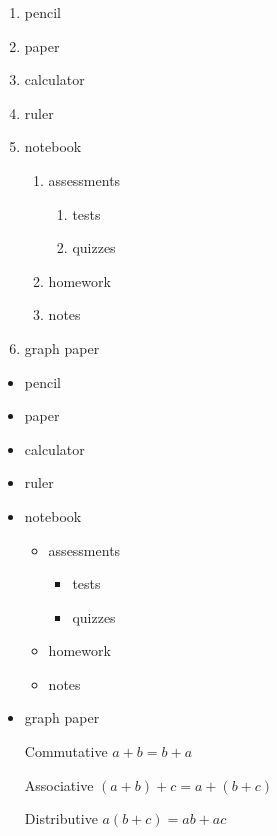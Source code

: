 \documentclass[11pt]{article}
\begin{document}
\begin{enumerate}
\item pencil
\item paper
\item calculator
\item ruler
\item notebook
	\begin{enumerate}
	\item assessments
		\begin{enumerate}
		\item tests
		\item quizzes
		\end{enumerate}
	\item homework
	\item notes
	\end{enumerate}
\item graph paper
\end{enumerate}

\begin{itemize}
\item pencil
\item paper
\item calculator
\item ruler
\item notebook
	\begin{itemize}
	\item assessments
		\begin{itemize}
		\item tests
		\item quizzes
		\end{itemize}
	\item homework
	\item notes
	\end{itemize}
\item graph paper
\end{itemize}

\begin{enumerate}
\item[Commutative] $a+b=b+a$
\item[Associative] $(a+b)+c=a+(b+c)$
\item[Distributive] $a(b+c)=ab+ac$
\end{enumerate}
\end{document}
